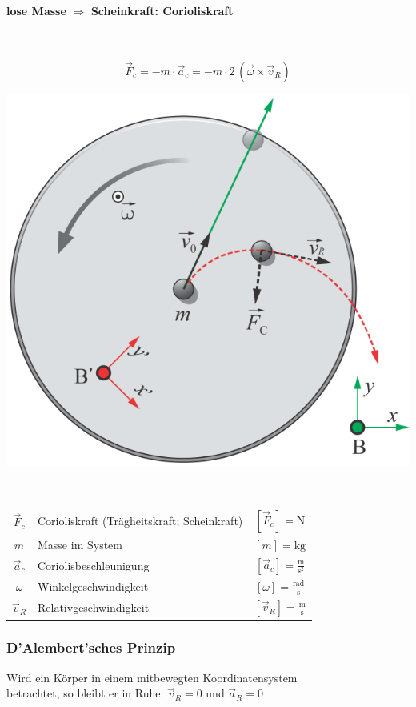 	
	
	
	
	
	\textbf{lose Masse} $\Rightarrow$ \textbf{Scheinkraft: Corioliskraft} \\	
	\\
	\\
	\begin{minipage}{0.48\linewidth}
	$$ \boxed{\vec{F}_c = - m \cdot \vec{a}_c = - m \cdot 2 \, (\vec{\omega} \times \vec{v}_R)} $$ 
	\end{minipage}
	\hfill
	\begin{minipage}{0.48\linewidth}
	\includegraphics[width=0.75\linewidth]{Bilder/corioliskraft} \\
	\end{minipage}
	\\
	
	\begin{tabular}{c l c}
	$\vec{F}_c$ & Corioliskraft (Trägheitskraft; Scheinkraft) & $[\vec{F}_c] = \mathrm{N}$ \\
	$m$ & Masse im System & $[m] = \mathrm{kg}$ \\
	$\vec{a}_c$ & Coriolisbeschleunigung & $[\vec{a}_c] = \mathrm{\frac{m}{s^2}}$ \\
	$\omega$ & Winkelgeschwindigkeit & $[\omega] = \mathrm{\frac{rad}{s}}$ \\
	$\vec{v}_R$ & Relativgeschwindigkeit & $[\vec{v}_R] = \mathrm{\frac{m}{s}}$ \\ 
	\end{tabular}
	
	
	
	\subsubsection{D'Alembert'sches Prinzip}
	Wird ein Körper in einem mitbewegten Koordinatensystem \\
	betrachtet, so bleibt er in Ruhe: \quad $\vec{v}_R = 0$ und $\vec{a}_R = 0$ \\
	

